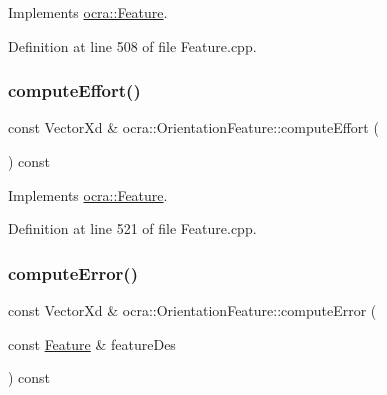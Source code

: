 Implements \hyperlink{classocra_1_1Feature_a19626a241666fdae253af1f7b6f2acd7}{ocra\+::\+Feature}.



Definition at line 508 of file Feature.\+cpp.

\hypertarget{classocra_1_1OrientationFeature_aa2d2bee82d7c9bef9f565e328204a2f2}{}\label{classocra_1_1OrientationFeature_aa2d2bee82d7c9bef9f565e328204a2f2} 
\subsubsection{\texorpdfstring{compute\+Effort()}{computeEffort()}\hspace{0.1cm}{\footnotesize\ttfamily [2/2]}}
{\footnotesize\ttfamily const Vector\+Xd \& ocra\+::\+Orientation\+Feature\+::compute\+Effort (\begin{DoxyParamCaption}{ }\end{DoxyParamCaption}) const\hspace{0.3cm}{\ttfamily [virtual]}}



Implements \hyperlink{classocra_1_1Feature_ae43f2ffc54862d6ddc0b02fd39431eb6}{ocra\+::\+Feature}.



Definition at line 521 of file Feature.\+cpp.

\hypertarget{classocra_1_1OrientationFeature_a013b77e19c995ce9eaf8b76463b8edc7}{}\label{classocra_1_1OrientationFeature_a013b77e19c995ce9eaf8b76463b8edc7} 
\subsubsection{\texorpdfstring{compute\+Error()}{computeError()}\hspace{0.1cm}{\footnotesize\ttfamily [1/2]}}
{\footnotesize\ttfamily const Vector\+Xd \& ocra\+::\+Orientation\+Feature\+::compute\+Error (\begin{DoxyParamCaption}\item[{const \hyperlink{classocra_1_1Feature}{Feature} \&}]{feature\+Des }\end{DoxyParamCaption}) const\hspace{0.3cm}{\ttfamily [virtual]}}



